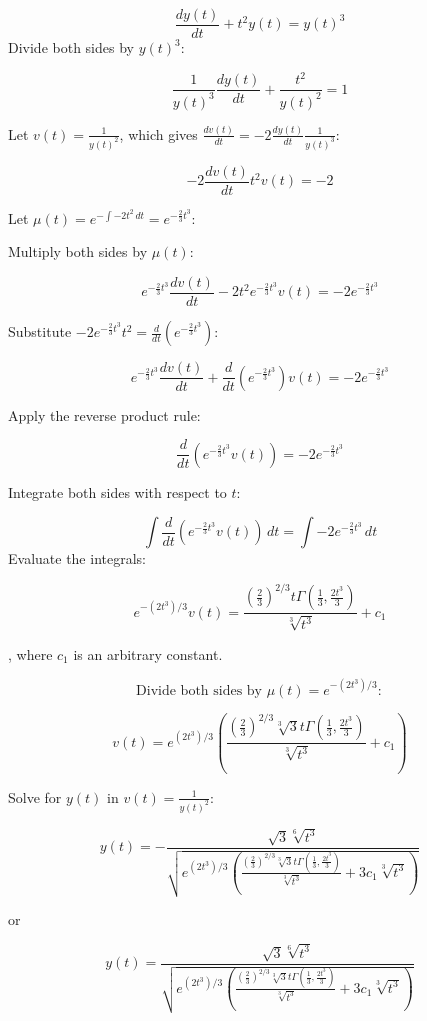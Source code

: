 \documentclass{article}
\begin{document}
\[
\frac{dy(t)}{dt} + t^2 y(t) = y(t)^3
\]
Divide both sides by \(y(t)^3\):

\[
\frac{1}{y(t)^3} \frac{dy(t)}{dt} + \frac{t^2}{y(t)^2} = 1
\]

Let \(v(t) = \frac{1}{y(t)^2}\), which gives \(\frac{dv(t)}{dt} = -2 \frac{dy(t)}{dt} \frac{1}{y(t)^3}\):

\[
-2 \frac{dv(t)}{dt} t^2 v(t) = -2
\]

Let \(\mu(t) = e^{- \int -2 t^2 \, dt} = e^{- \frac{2}{3} t^3}\):

Multiply both sides by \(\mu(t)\):

\[
e^{-\frac{2}{3} t^3} \frac{d v(t)}{dt} - 2 t^2 e^{-\frac{2}{3} t^3} v(t) = -2 e^{-\frac{2}{3} t^3}
\]

Substitute \(-2 e^{-\frac{2}{3} t^3} t^2 = \frac{d}{dt}(e^{-\frac{2}{3} t^3})\):

\[
e^{-\frac{2}{3} t^3} \frac{d v(t)}{dt} + \frac{d}{dt} (e^{-\frac{2}{3} t^3}) v(t) = -2 e^{-\frac{2}{3} t^3}
\]

Apply the reverse product rule:

\[
\frac{d}{dt} (e^{-\frac{2}{3} t^3} v(t)) = -2 e^{-\frac{2}{3} t^3}
\]

Integrate both sides with respect to \(t\):

\[
\int \frac{d}{dt} (e^{-\frac{2}{3} t^3} v(t)) \, dt = \int -2 e^{-\frac{2}{3} t^3} \, dt
\]
Evaluate the integrals:

\[
e^{-(2t^3)/3} v(t) = \frac{\left(\frac{2}{3}\right)^{2/3} t \Gamma\left(\frac{1}{3}, \frac{2t^3}{3}\right)}{\sqrt[3]{t^3}} + c_1
\]

, where \( c_1 \) is an arbitrary constant.

\[
\text{Divide both sides by } \mu(t) = e^{-(2t^3)/3}:
\]

\[
v(t) = e^{(2t^3)/3} \left( \frac{\left(\frac{2}{3}\right)^{2/3} \sqrt[3]{3} t \Gamma\left(\frac{1}{3}, \frac{2t^3}{3}\right)}{\sqrt[3]{t^3}} + c_1 \right)
\]

Solve for \( y(t) \) in \( v(t) = \frac{1}{y(t)^2} \):

\[
y(t) = - \frac{\sqrt{3} \sqrt[6]{t^3}}{\sqrt{e^{(2t^3)/3} \left( \frac{\left(\frac{2}{3}\right)^{2/3} \sqrt[3]{3} t \Gamma\left(\frac{1}{3}, \frac{2t^3}{3}\right)}{\sqrt[3]{t^3}} + 3 c_1 \sqrt[3]{t^3} \right)}}
\]

or

\[
y(t) = \frac{\sqrt{3} \sqrt[6]{t^3}}{\sqrt{e^{(2t^3)/3} \left( \frac{\left(\frac{2}{3}\right)^{2/3} \sqrt[3]{3} t \Gamma\left(\frac{1}{3}, \frac{2t^3}{3}\right)}{\sqrt[3]{t^3}} + 3 c_1 \sqrt[3]{t^3} \right)}}
\]
\end{document}
